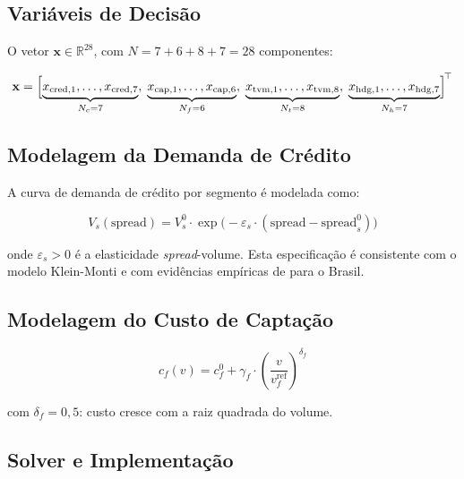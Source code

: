 \documentclass[12pt, a4paper, oneside]{article}
\newcommand{\R}{\mathbb{R}}
\begin{document}
\subsection{Variáveis de Decisão}

O vetor $\mathbf{x} \in \R^{28}$, com $N = 7 + 6 + 8 + 7 = 28$ componentes:

\begin{equation}
  \mathbf{x} = \Bigl[
    \underbrace{x_{\text{cred},1},\ldots,x_{\text{cred},7}}_{N_c=7},\;
    \underbrace{x_{\text{cap},1},\ldots,x_{\text{cap},6}}_{N_f=6},\;
    \underbrace{x_{\text{tvm},1},\ldots,x_{\text{tvm},8}}_{N_t=8},\;
    \underbrace{x_{\text{hdg},1},\ldots,x_{\text{hdg},7}}_{N_h=7}
  \Bigr]^{\!\top}
  \label{eq:vetor_x}
\end{equation}

\subsection{Modelagem da Demanda de Crédito}

A curva de demanda de crédito por segmento é modelada como:

\begin{equation}
  V_s(\text{spread}) = V_s^0 \cdot
    \exp\!\bigl(-\varepsilon_s \cdot (\text{spread} - \text{spread}_s^0)\bigr)
  \label{eq:demanda_credito}
\end{equation}

\noindent onde $\varepsilon_s > 0$ é a elasticidade \textit{spread}-volume.
Esta especificação é consistente com o modelo Klein-Monti
\citep{Klein1971,Monti1972} e com evidências empíricas de
\citet{Coelho2012} para o Brasil.

\subsection{Modelagem do Custo de Captação}

\begin{equation}
  c_f(v) = c_f^0 + \gamma_f \cdot
    \left(\frac{v}{v_f^{\text{ref}}}\right)^{\!\delta_f}
  \label{eq:custo_captacao}
\end{equation}

\noindent com $\delta_f = 0{,}5$: custo cresce com a raiz quadrada do volume.

\subsection{Solver e Implementação}
\end{document}
